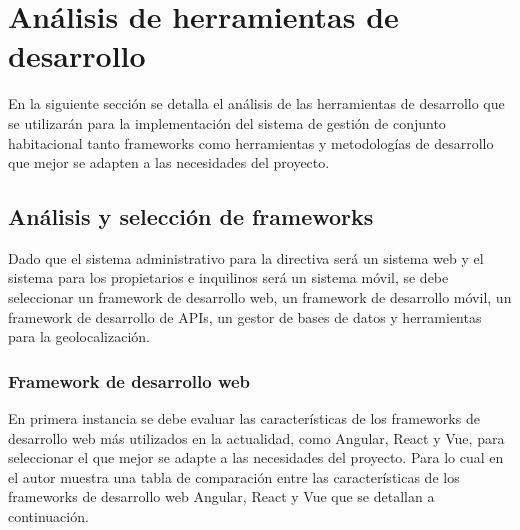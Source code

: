 \section{Análisis de herramientas de desarrollo}\label{sec:analisis-frameworks-desarrollo}

En la siguiente sección se detalla el análisis de las herramientas de desarrollo que se utilizarán para la implementación del sistema de gestión de conjunto habitacional tanto frameworks como herramientas y metodologías de desarrollo que mejor se adapten a las necesidades del proyecto.

\subsection{Análisis y selección de frameworks}\label{subsec:analisis-seleccion-frameworks-desarrollo}

Dado que el sistema administrativo para la directiva será un sistema web y el sistema para los propietarios e inquilinos será un sistema móvil, se debe seleccionar un framework de desarrollo web, un framework de desarrollo móvil, un framework de desarrollo de APIs, un gestor de bases de datos y herramientas para la geolocalización.

\subsubsection{Framework de desarrollo web}\label{subsubsec:framework-desarrollo-web}

En primera instancia se debe evaluar las características de los frameworks de desarrollo web más utilizados en la actualidad, como Angular, React y Vue, para seleccionar el que mejor se adapte a las necesidades del proyecto.
Para lo cual en \cite{wu_desarrollo_2014}  el autor muestra una tabla de comparación entre las características de los frameworks de desarrollo web Angular, React y Vue que se detallan a continuación.

